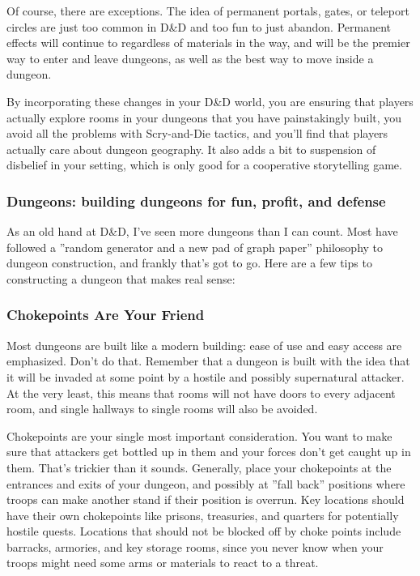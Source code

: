 Of course, there are exceptions. The idea of permanent portals, gates, or teleport circles are just too common in D\&D and too fun to just abandon. Permanent effects will continue to regardless of materials in the way, and will be the premier way to enter and leave dungeons, as well as the best way to move inside a dungeon.

By incorporating these changes in your D\&D world, you are ensuring that players actually explore rooms in your dungeons that you have painstakingly built, you avoid all the problems with Scry-and-Die tactics, and you'll find that players actually care about dungeon geography. It also adds a bit to suspension of disbelief in your setting, which is only good for a cooperative storytelling game.

\subsubsection{Dungeons: building dungeons for fun, profit, and defense}
As an old hand at D\&D, I've seen more dungeons than I can count. Most have followed a ''random generator and a new pad of graph paper'' philosophy to dungeon construction, and frankly that's got to go. Here are a few tips to constructing a dungeon that makes real sense:

\subsubsection{Chokepoints Are Your Friend}
Most dungeons are built like a modern building: ease of use and easy access are emphasized. Don't do that. Remember that a dungeon is built with the idea that it will be invaded at some point by a hostile and possibly supernatural attacker. At the very least, this means that rooms will not have doors to every adjacent room, and single hallways to single rooms will also be avoided.

Chokepoints are your single most important consideration. You want to make sure that attackers get bottled up in them and your forces don't get caught up in them. That's trickier than it sounds. Generally, place your chokepoints at the entrances and exits of your dungeon, and possibly at ''fall back'' positions where troops can make another stand if their position is overrun. Key locations should have their own chokepoints like prisons, treasuries, and quarters for potentially hostile quests. Locations that should not be blocked off by choke points include barracks, armories, and key storage rooms, since you never know when your troops might need some arms or materials to react to a threat.

